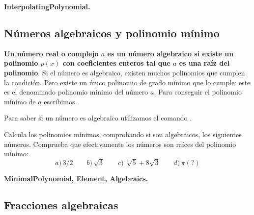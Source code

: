 \documentclass[a4paper,10pt, draft]{article}
\newcommand{\com}[1]{\textbf{\color{blue}{#1}}}
\newenvironment{capitulo}{\begin{tcolorbox}[colback=red!5!white,colframe=red!75!black]}{\end{tcolorbox}\bigskip}
\newenvironment{ejer}{\begin{tcolorbox}[center title, title=Ejercicios,
fonttitle=\sffamily\bfseries,colback=blue!5,colframe=orange]}{\end{tcolorbox}}
\newenvironment{funciones}{\begin{tcolorbox}[center title, title=Nuevas funciones, fonttitle=\sffamily\bfseries, colback=green!5!white,colframe=red!75!black]}{\end{tcolorbox}\bigskip}
\begin{document}
\begin{funciones}

\textbf{InterpolatingPolynomial.}


\end{funciones} 

\newpage


\subsection{Números algebraicos y polinomio mínimo}

\textbf{Un número real o complejo $a$ es un número algebraico si existe un polinomio $p(x)$ con coeficientes  enteros tal que $a$ es  una raíz del polinomio}. Si el número es algebraico, existen muchos polinomios que cumplen la condición. Pero existe un único polinomio de grado mínimo que lo cumple: este es el denominado polinomio mínimo del número $a$. Para conseguir el polinomio mínimo de $a$ escribimos \com{MinimalPolynomial[a,x]}.

Para saber si un número es algebraico utilizamos el comando \com{Element[a, Algebraics]}. 

\begin{ejer}

Calcula los polinomios mínimos, comprobando si son algebraicos, los siguientes números. Comprueba que efectivamente los números son raíces del polinomio mínimo:
$$
a)\, 3/2 \qquad b)\, \sqrt{3} \qquad c)\, \sqrt[3]{5}+8\sqrt{3}\qquad d)\, \pi (?)
$$

\end{ejer}




\begin{funciones}

\textbf{MinimalPolynomial, Element, Algebraics.}

\end{funciones}







\newpage


\begin{capitulo}

\section{Fracciones algebraicas}


\end{capitulo}
\end{document}

